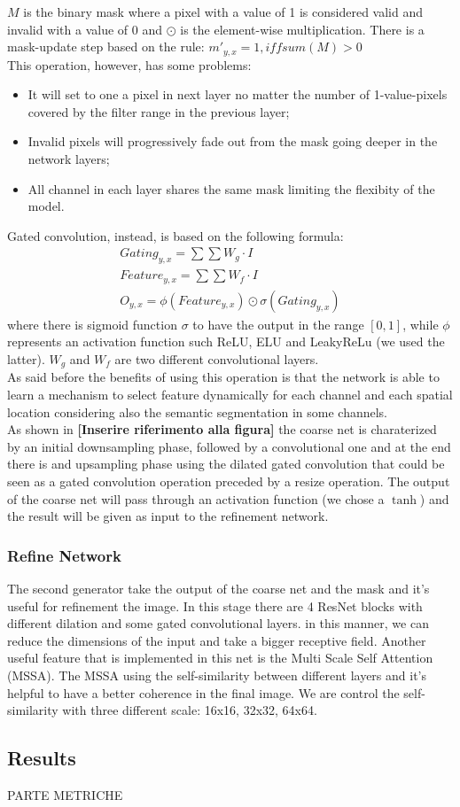 \documentclass[10pt,twocolumn,letterpaper]{article}
\begin{document}
	\(M\) is the binary mask where a pixel with a value of 1 is considered valid and invalid with a value of 0 and \(\odot\) is the element-wise multiplication.
	There is a mask-update step based on the rule: \(m'_{y,x} = 1, iff sum(M) > 0\)
	\\
	This operation, however, has some problems:
	\begin{itemize}
		\item
		It will set to one a pixel in next layer no matter the number of 1-value-pixels covered by the filter range in the previous layer;
		\item
		Invalid pixels will progressively fade out from the mask going deeper in the network layers;
		\item
		All channel in each layer shares the same mask limiting the flexibity of the model.
	\end{itemize}
	Gated convolution, instead, is based on the following formula:
	\begin{gather}
		Gating_{y,x} = \sum \sum W_g \cdot I \\
		Feature_{y,x} = \sum \sum W_f \cdot I \\
		O_{y,x} = \phi (Feature_{y,x}) \odot \sigma (Gating_{y,x})
	\end{gather}
	where there is sigmoid function \(\sigma\) to have the output in the range \([0,1]\), while \(\phi\) represents an activation function such ReLU, ELU and LeakyReLu (we used the latter). \(W_g\) and \(W_f\) are two different convolutional layers.
	\\
	As said before the benefits of using this operation is that the network is able to learn a mechanism to select feature dynamically for each channel and each spatial location considering also the semantic segmentation in some channels.
	\\
	As shown in \textbf{[Inserire riferimento alla figura]} the coarse net is charaterized by an initial downsampling phase, followed by a convolutional one and at the end there is and upsampling phase using the dilated gated convolution that could be seen as a gated convolution operation preceded by a resize operation. The output of the coarse net will pass through an activation function (we chose a \(\tanh\)) and the result will be given as input to the refinement network.
	\subsubsection{Refine Network}
	The second generator take the output of the coarse net and the mask and it's useful for refinement the image.
	In this stage there are 4 ResNet blocks with different dilation and some gated convolutional layers. in this manner, we can reduce the dimensions of the input and take a bigger receptive field. Another useful feature that is implemented in this net is the Multi Scale Self Attention (MSSA). The MSSA using the self-similarity between different layers and it's helpful to have a better coherence in the final image. We are control the self-similarity with three different scale: 16x16, 32x32, 64x64.


	\subsection{Results}
	PARTE METRICHE


	{\small
		
		
	}
\end{document}
